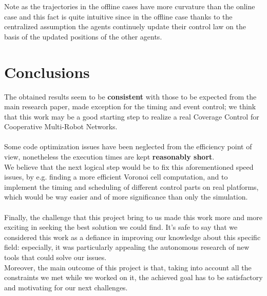 \documentclass[a4paper,11pt,oneside]{book}
\begin{document}
	Note as the trajectories in the offline cases have more curvature than the online case and this fact is quite intuitive since in the offline case thanks to the centralized assumption the agents continuely update their control law on the basis of the updated positions of the other agents.
	
	
	\chapter*{Conclusions} %
	The obtained results seem to be \textbf{consistent} with those to be expected from the main research paper, made exception for the timing and event control; we think that this work may be a good starting step to realize a real Coverage Control for Cooperative Multi-Robot Networks.\\\\
	
	Some code optimization issues have been neglected from the efficiency point of view, nonetheless the execution times are kept \textbf{reasonably short}.\\
	We believe that the next logical step would be to fix this aforementioned speed issues, by e.g. finding a more efficient Voronoi cell computation, and to implement the timing and scheduling of different control parts on real platforms, which would be way easier and of more significance than only the simulation.\\\\
	
	Finally, the challenge that this project bring to us made this work more and more exciting in seeking the best solution we could find. It's safe to say that we considered this work as a defiance in improving our knowledge about this specific field: especially, it was particularly appealing the autonomous research of new tools that could solve our issues.\\
	Moreover, the main outcome of this project is that, taking into account all the constraints we met while we worked on it, the achieved goal has to be satisfactory and motivating for our next challenges.
	
	
\end{document}
